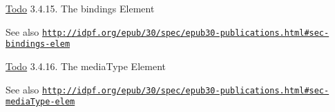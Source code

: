 \begin{Desc}
\item[\hyperlink{todo__todo000001}{Todo}]3.4.15. The bindings Element \end{Desc}
\begin{DoxySeeAlso}{See also}
\href{http://idpf.org/epub/30/spec/epub30-publications.html#sec-bindings-elem}{\tt http://idpf.org/epub/30/spec/epub30-\/publications.html\#sec-\/bindings-\/elem}
\end{DoxySeeAlso}
\begin{Desc}
\item[\hyperlink{todo__todo000002}{Todo}]3.4.16. The mediaType Element \end{Desc}
\begin{DoxySeeAlso}{See also}
\href{http://idpf.org/epub/30/spec/epub30-publications.html#sec-mediaType-elem}{\tt http://idpf.org/epub/30/spec/epub30-\/publications.html\#sec-\/mediaType-\/elem} 
\end{DoxySeeAlso}
